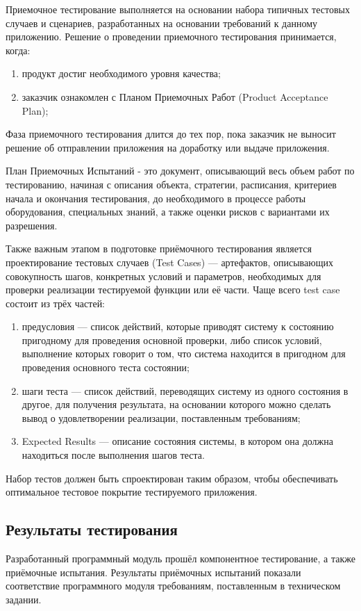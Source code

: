 Приемочное тестирование выполняется на основании набора типичных тестовых случаев и сценариев, разработанных на
основании требований к данному приложению. Решение о проведении приемочного тестирования принимается, когда:

\begin{enumerate}
\item продукт достиг необходимого уровня качества;
\item заказчик ознакомлен с Планом Приемочных Работ (Product Acceptance Plan);
\end{enumerate}

Фаза приемочного тестирования длится до тех пор, пока заказчик не выносит решение об отправлении приложения на
доработку или выдаче приложения.

План Приемочных Испытаний -  это документ, описывающий весь объем работ по тестированию, начиная с описания объекта,
стратегии, расписания, критериев начала и окончания тестирования, до необходимого в процессе работы оборудования,
специальных знаний, а также оценки рисков с вариантами их разрешения.

Также важным этапом в подготовке приёмочного тестирования является проектирование тестовых случаев (Test Cases) ---
артефактов, описывающих совокупность шагов, конкретных условий и параметров, необходимых для проверки реализации
тестируемой функции или её части. Чаще всего test case состоит из трёх частей:

\begin{enumerate}
\item предусловия --- список действий, которые приводят систему к состоянию пригодному для проведения основной
проверки, либо список условий, выполнение которых говорит о том, что система находится в пригодном для проведения
основного теста состоянии;
\item шаги теста --- список действий, переводящих систему из одного состояния в другое, для получения
результата, на основании которого можно сделать вывод о удовлетворении реализации, поставленным требованиям;
\item Expected Results --- описание состояния системы, в котором она должна находиться после выполнения шагов теста.
\end{enumerate}

Набор тестов должен быть спроектирован таким образом, чтобы обеспечивать оптимальное тестовое покрытие тестируемого
приложения.

\subsection{Результаты тестирования}

Разработанный программный модуль прошёл компонентное тестирование, а также приёмочные испытания. Результаты приёмочных
испытаний показали соответствие программного модуля требованиям, поставленным в техническом задании.

